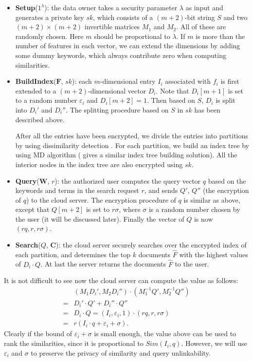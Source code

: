 \documentclass{article}
\begin{document}
\begin{itemize}
\item \textbf{Setup}($1^\lambda$): the data owner takes a security parameter $\lambda$ as input and generates a private key $sk$, which consists of a $(m+2)$-bit string $S$ and two $(m+2)\times (m+2)$ invertible matrices $M_1$ and $M_2$. All of these are randomly chosen. Here $m$ should be proportional to $\lambda$. If $m$ is more than the number of features in each vector, we can extend the dimensions by adding some dummy keywords, which always contribute zero when computing similarities.
\item \textbf{BuildIndex}($\mathbf{F}$, $sk$): each $m$-dimensional entry $I_i$ associated with $f_i$ is first extended to a $(m+2)$-dimensional vector $D_i$. Note that $D_i[m+1]$ is set to a random number $\varepsilon_i$ and $D_i[m+2]=1$. Then based on $S$, $D_i$ is split into $D_i'$ and $D_i''$. The splitting procedure based on $S$ in $sk$ has been described above. 

After all the entries have been encrypted, we divide the entries into partitions by using dissimilarity detection \cite{TAJY14}. For each partition, we build an index tree by using MD algorithm \cite{Sun13} (\cite{Xia16} gives a similar index tree building solution). All the interior nodes in the index tree are also encrypted using $sk$.
\item \textbf{Query}($\mathbf{W}$, $r$): the authorized user computes the query vector $q$ based on the keywords and terms in the search request $r$, and sends $Q'$, $Q''$ (the encryption of $q$) to the cloud server. The encryption procedure of $q$ is similar as above, except that $Q[m+2]$ is set to $r\sigma$, where $\sigma$ is a random number chosen by the user (it will be discussed later). Finally the vector of $Q$ is now $(rq,r,r\sigma)$.
\item \textbf{Search}($Q$, $\mathbf{C}$): the cloud server securely searches over the encrypted index of each partition, and determines the top $k$ documents $\hat{F}$ with the highest values of $D_i\cdot Q$. At last the server returns the documents $\hat{F}$ to the user.
\end{itemize}
It is not difficult to see now the cloud server can compute the value as follows:
\begin{equation*}
\begin{aligned}
&(M_1D_i', M_2D_i'')\cdot(M_1^{-1}Q', M_2^{-1}Q'') \\
=&D_i'\cdot Q' + D_i''\cdot Q''\\
=&D_i \cdot Q = (I_i,\varepsilon_i,1)\cdot (rq,r,r\sigma)\\
=&r(I_i\cdot q+\varepsilon_i+\sigma).
\end{aligned}
\end{equation*}
Clearly if the bound of $\varepsilon_i+\sigma$ is small enough, the value above can be used to rank the similarities, since it is proportional to $Sim(I_i, q)$. However, we will use $\varepsilon_i$ and $\sigma$ to preserve the privacy of similarity and query unlinkability. 
\end{document}
